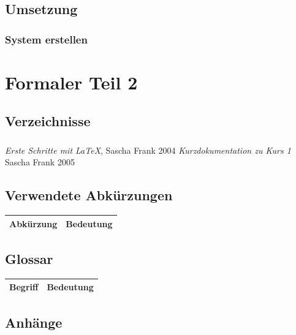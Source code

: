\documentclass{report}
\makeatletter
\renewcommand\listoftables{%
    \section{\listtablename}%
    \@mkboth{\MakeUppercase\listtablename}%
        {\MakeUppercase\listtablename}%
    \@starttoc{lot}%
}
\renewcommand\listoffigures{%
    \section{\listfigurename}%
    \@mkboth{\MakeUppercase\listfigurename}%
        {\MakeUppercase\listfigurename}%
    \@starttoc{lof}%
}
\makeatother
\begin{document}
\chapter{Umsetzung}
\section{System erstellen}

\part{Formaler Teil 2}

\chapter{Verzeichnisse}
\listoftables
\listoffigures
\begin{thebibliography}{9}
     \emph{Erste Schritte mit \LaTeX},
    Sascha Frank 2004
     \emph{Kurzdokumentation zu Kurs 1}
    Sascha Frank 2005 
\end{thebibliography}

\chapter{Verwendete Abkürzungen}
\begin{table}[h!]
    \begin{tabular}{|L{0.3\textwidth}|L{0.6\textwidth}|}
        \hline
         Abkürzung & Bedeutung \\
        \hline
    \end{tabular}
\end{table}

\chapter{Glossar}
\begin{table}[h!]
    \begin{tabular}{|L{0.3\textwidth}|L{0.6\textwidth}|}
        \hline
         Begriff & Bedeutung \\[12pt]
        \hline
    \end{tabular}
\end{table}
\chapter{Anhänge}
\end{document}
